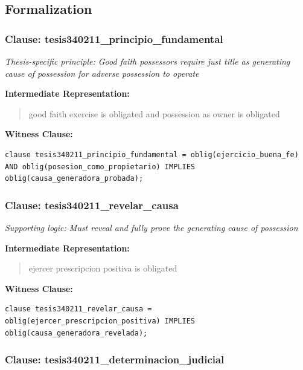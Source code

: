\documentclass[11pt,a4paper]{article}
\begin{document}
\subsection{Formalization}

\subsubsection{Clause: tesis340211\_principio\_fundamental}

\textit{Thesis-specific principle: Good faith possessors require just title as generating cause of possession for adverse possession to operate}

\textbf{Intermediate Representation:}

\begin{quote}
good faith exercise is obligated and possession as owner is obligated
\end{quote}

\textbf{Witness Clause:}

\begin{lstlisting}[style=witnessstyle, language=Witness]
clause tesis340211_principio_fundamental = oblig(ejercicio_buena_fe) AND oblig(posesion_como_propietario) IMPLIES oblig(causa_generadora_probada);
\end{lstlisting}

\subsubsection{Clause: tesis340211\_revelar\_causa}

\textit{Supporting logic: Must reveal and fully prove the generating cause of possession}

\textbf{Intermediate Representation:}

\begin{quote}
ejercer prescripcion positiva is obligated
\end{quote}

\textbf{Witness Clause:}

\begin{lstlisting}[style=witnessstyle, language=Witness]
clause tesis340211_revelar_causa = oblig(ejercer_prescripcion_positiva) IMPLIES oblig(causa_generadora_revelada);
\end{lstlisting}

\subsubsection{Clause: tesis340211\_determinacion\_judicial}
\end{document}
